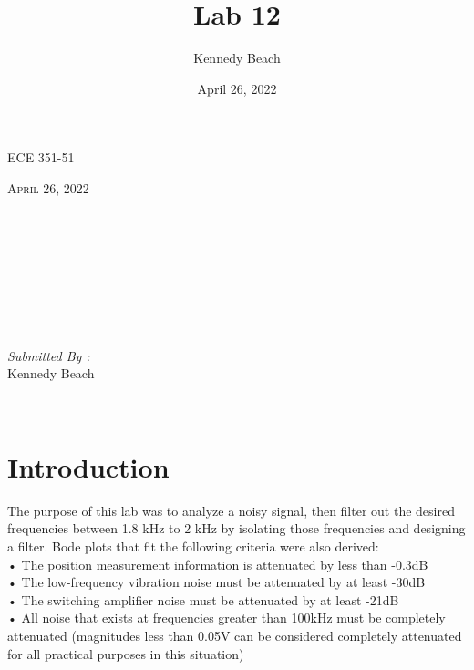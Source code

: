 \documentclass[12pt]{report}
\title{Lab 12}
\author{Kennedy Beach}
\date{April 26, 2022}
\makeatletter
\let\thetitle\@title
\makeatother
\begin{document}
\begin{titlepage}
\centering
\vspace*{0.5 cm}
\begin{center}    \textsc{\Large   ECE 351-51 }\\[2.0 cm]
\end{center}%
\textsc{\Large April 26, 2022}\\[0.5 cm] %
\rule{\linewidth}{0.2 mm} \\[0.4 cm]
{ \huge \bfseries \thetitle}\\
\rule{\linewidth}{0.2 mm} \\[1.5 cm]
\begin{minipage}{0.4\textwidth}
\begin{flushleft} \large
\end{flushleft}
\end{minipage}~
\begin{minipage}{0.4\textwidth}
\begin{flushright} \large
\emph{Submitted By :} \\
Kennedy Beach
\end{flushright}
\end{minipage}\\[2 cm]
\end{titlepage}
\tableofcontents
\pagebreak
\renewcommand{\thesection}{\arabic{section}}
\section{Introduction}
The purpose of this lab was to analyze a noisy signal, then filter out the desired frequencies between 1.8 kHz to 2 kHz by isolating those frequencies and designing a filter. Bode plots that fit the following criteria were also derived:\\
• The position measurement information is attenuated by less than -0.3dB\\
• The low-frequency vibration noise must be attenuated by at least -30dB\\
• The switching amplifier noise must be attenuated by at least -21dB\\
• All noise that exists at frequencies greater than 100kHz must be completely attenuated
(magnitudes less than 0.05V can be considered completely attenuated for all practical
purposes in this situation)
\end{document}
